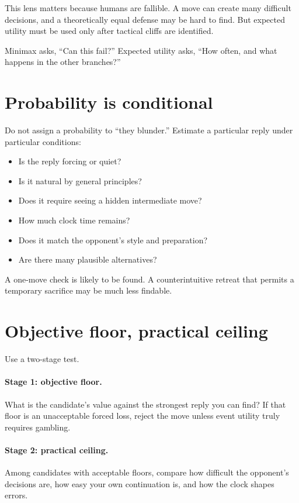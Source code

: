 This lens matters because humans are fallible. A move can create many difficult decisions, and a theoretically equal defense may be hard to find. But expected utility must be used only after tactical cliffs are identified.

\begin{intuitionbox}
Minimax asks, ``Can this fail?'' Expected utility asks, ``How often, and what happens in the other branches?''
\end{intuitionbox}

\section{Probability is conditional}
Do not assign a probability to ``they blunder.'' Estimate a particular reply under particular conditions:

\begin{itemize}[leftmargin=1.4em]
\item Is the reply forcing or quiet?
\item Is it natural by general principles?
\item Does it require seeing a hidden intermediate move?
\item How much clock time remains?
\item Does it match the opponent's style and preparation?
\item Are there many plausible alternatives?
\end{itemize}

A one-move check is likely to be found. A counterintuitive retreat that permits a temporary sacrifice may be much less findable.

\section{Objective floor, practical ceiling}
Use a two-stage test.

\paragraph{Stage 1: objective floor.} What is the candidate's value against the strongest reply you can find? If that floor is an unacceptable forced loss, reject the move unless event utility truly requires gambling.

\paragraph{Stage 2: practical ceiling.} Among candidates with acceptable floors, compare how difficult the opponent's decisions are, how easy your own continuation is, and how the clock shapes errors.

